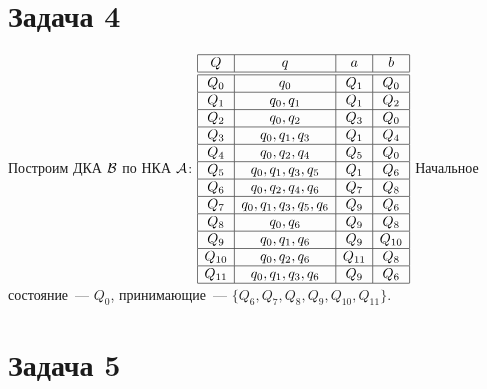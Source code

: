 \documentclass[a4paper]{article}
\def\A{{\cal A}}
\def\B{{\cal B}}
\begin{document}
\section*{Задача 4}
Построим ДКА $\B$ по НКА $\A$:\newline
$\begin{array}{|c|c|c|c|}
\hline
Q & q & a & b\\\hline\hline
Q_0 & q_0						& Q_1  & Q_0 \\\hline
Q_1 & q_0, q_1					& Q_1  & Q_2 \\\hline
Q_2 & q_0, q_2					& Q_3  & Q_0 \\\hline
Q_3 & q_0, q_1, q_3				& Q_1  & Q_4 \\\hline
Q_4 & q_0, q_2, q_4				& Q_5  & Q_0 \\\hline
Q_5 & q_0, q_1, q_3, q_5		& Q_1  & Q_6 \\\hline
Q_6 & q_0, q_2, q_4, q_6		& Q_7  & Q_8 \\\hline
Q_7 & q_0, q_1, q_3, q_5, q_6	& Q_9  & Q_6 \\\hline
Q_8 & q_0, q_6					& Q_9  & Q_8 \\\hline
Q_9 & q_0, q_1, q_6				& Q_9  & Q_{10}\\\hline
Q_{10} & q_0, q_2, q_6				& Q_{11} & Q_8 \\\hline
Q_{11} & q_0, q_1, q_3, q_6		& Q_9  & Q_6 \\\hline
\end{array}$
\newline
Начальное состояние~--- $Q_0$, принимающие~--- $\{Q_6, Q_7, Q_8, Q_9, Q_{10}, Q_{11}\}$.
\section*{Задача 5}
\end{document}
